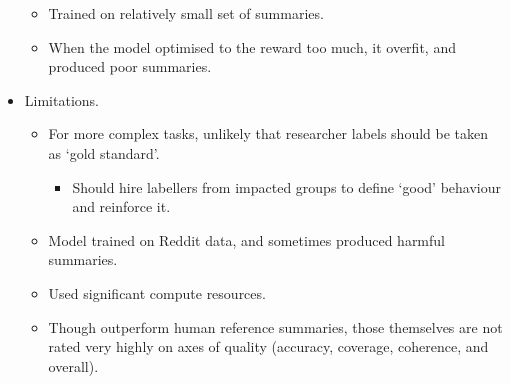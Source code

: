 \begin{itemize}
\begin{itemize}
        \item Trained on relatively small set of summaries.
        \item When the model optimised to the reward too much, it overfit, and produced poor summaries.
    \end{itemize}
    \item Limitations.
    \begin{itemize}
        \item For more complex tasks, unlikely that researcher labels should be taken as `gold standard'.
        \begin{itemize}
            \item Should hire labellers from impacted groups to define `good' behaviour and reinforce it.
        \end{itemize}
        \item Model trained on Reddit data, and sometimes produced harmful summaries.
        \item Used significant compute resources.
        \item Though outperform human reference summaries, those themselves are not rated very highly on axes of quality (accuracy, coverage, coherence, and overall).
    \end{itemize}
\end{itemize}